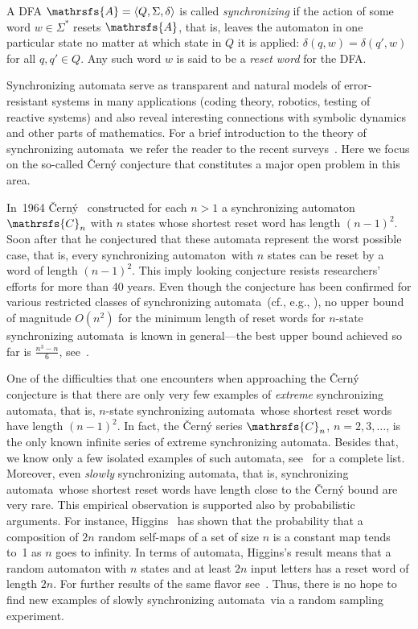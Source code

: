 \documentclass[11pt]{llncs}
\newcommand{\sa}{synchronizing automata}
\newcommand{\san}{synchronizing automaton}
\begin{document}
A DFA $\mathrsfs{A}=\langle Q,\Sigma,\delta\rangle$ is called
\emph{synchronizing} if the action of some word $w\in\Sigma^*$
resets $\mathrsfs{A}$, that is, leaves the automaton in one
particular state no matter at which state in $Q$ it is applied:
$\delta(q,w)=\delta(q',w)$ for all $q,q'\in Q$. Any such word $w$
is said to be a \emph{reset word} for the DFA.

Synchronizing automata serve as transparent and natural models of
error-resistant systems in many applications (coding theory, robotics,
testing of reactive systems) and also reveal interesting connections
with symbolic dynamics and other parts of mathematics. For a brief
introduction to the theory of \sa\ we refer the reader to the recent
surveys~\cite{Sa05,Vo08}. Here we focus on the so-called \v{C}ern\'{y}
conjecture that constitutes a major open problem in this area.

In~1964 \v{C}ern\'{y}~\cite{Ce64} constructed for each $n>1$ a \san\
$\mathrsfs{C}_n$ with $n$ states whose shortest reset word has length
$(n-1)^2$. Soon after that he conjectured that these automata
represent the worst possible case, that is, every \san\ with $n$ states
can be reset by a word of length $(n-1)^2$. This imply looking conjecture
resists researchers' efforts for more than 40 years. Even though the
conjecture has been confirmed for various restricted classes of \sa\
(cf., e.g., \cite{Ep90,Du98,Ka03,Tr07,AS09,Vo09}), no upper bound of magnitude
$O(n^2)$ for the minimum length of reset words for $n$-state \sa\ is known
in general---the best upper bound achieved so far is $\frac{n^3-n}6$,
see~\cite{Pi83}.

One of the difficulties that one encounters when approaching the
\v{C}ern\'{y} conjecture is that there are only very few examples
of \emph{extreme} \sa, that is, $n$-state \sa\ whose shortest reset
words have length $(n-1)^2$. In fact, the \v{C}ern\'{y} series
$\mathrsfs{C}_n$, $n=2,3,\dotsc$, is the only known infinite series
of extreme \sa. Besides that, we know only a few isolated examples
of such automata, see~\cite{Vo08} for a complete list. Moreover,
even \emph{slowly} \sa, that is, \sa\ whose shortest reset words have
length close to the \v{C}ern\'{y} bound are very rare. This empirical
observation is supported also by probabilistic arguments. For instance,
Higgins~\cite{Hi88} has shown that the probability that a composition of $2n$
random self-maps of a set of size $n$ is a constant map tends to~1 as $n$
goes to infinity. In terms of automata, Higgins's result means that
a random automaton with $n$ states and at least $2n$ input letters
has a reset word of length $2n$. For further results of the same flavor
see~\cite{SZ}. Thus, there is no hope to find new examples of slowly
\sa\ via a random sampling experiment.
\end{document}
